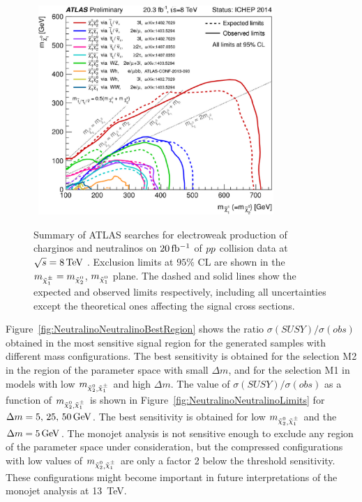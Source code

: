 \begin{figure}[!ht]
\begin{center}
\mbox{
\includegraphics[width=0.795\textwidth]{Interpretations/Figures/ATLAS_SUSY_EWSummary.eps}
}
\end{center}
\caption[Summary of ATLAS searches for electroweak production of charginos and neutralinos.]{Summary of ATLAS searches for electroweak production of charginos and neutralinos on $\unit[20]{fb^{-1}}$ of $pp$ collision data at $\sqrt{s} = \unit[8]{TeV}$ \protect\cite{Aad:2014nua}. Exclusion limits at $95\%$ CL are shown in the $m_{\chinoonepm} = m_{\ninotwo}$, $m_{\ninoone}$ plane. The dashed and solid lines show the expected and observed limits respectively, including all uncertainties except the theoretical ones affecting the signal cross sections.}
\label{fig:SUSYEWSummary}
\end{figure}

Figure~\ref{fig:NeutralinoNeutralinoBestRegion} shows the ratio $\sigma (SUSY) / \sigma (obs)$ obtained in the most sensitive signal region for the generated samples with different mass configurations.
The best sensitivity is obtained for the selection M2 in the region of the parameter space with small $\Delta m$, and for the selection M1 in models with low $m_{\ninotwo , \chinoonepm}$ and high $\Delta m$.
The value of $\sigma (SUSY) / \sigma (obs)$ as a function of $m_{\ninotwo , \chinoonepm}$ is shown in Figure~\ref{fig:NeutralinoNeutralinoLimits} for $\Delta m = \unit[5,\, 25,\, 50]{GeV}$. 
The best sensitivity is obtained for low $m_{\ninotwo , \chinoonepm}$ and the $\Delta m = \unit[5]{GeV}$.
The monojet analysis is not sensitive enough to exclude any region of the parameter space under consideration, but the compressed configurations with low values of $m_{\ninotwo , \chinoonepm}$ are only a factor 2 below the threshold sensitivity.
These configurations might become important in future interpretations of the monojet analysis at 13~TeV.

